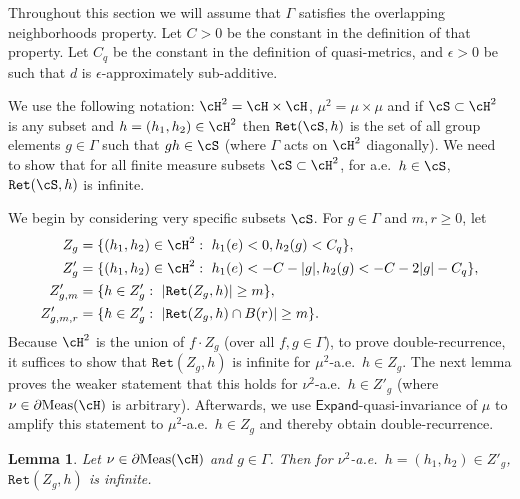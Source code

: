 \documentclass[12pt]{article}
\theoremstyle{plain}
\newtheorem{lem}[thm]{Lemma}
\theoremstyle{definition}
\theoremstyle{remark}
\newcommand{\G}{\Gamma}
\newcommand{\Add}{\mathsf{Expand}}
\newcommand\Expand{{\mathsf{Expand}}}
\newcommand\Meas{{\operatorname{Meas}}}
\newcommand\Ret{\mathtt{Ret}}
\def\cc{{\curvearrowright}}
\begin{document}
Throughout this section we will assume that $\G$ satisfies the overlapping neighborhoods property. Let $C>0$ be the constant in the definition of that property. Let $C_q$ be the constant in the definition of quasi-metrics, and $\epsilon>0$ be such that $d$ is $\epsilon$-approximately sub-additive. 


We use the following notation: $\cH^2=\cH\times \cH$, $\mu^2=\mu\times \mu$ and if $\cS \subset \cH^2$ is any subset and $h=(h_1,h_2)\in \cH^2$ then $\Ret(\cS, h)$ is the set of all group elements $g\in \G$ such that $gh \in \cS$ (where $\G$ acts on $\cH^2$ diagonally). We need to show that for all finite measure subsets $\cS\subset \cH^2$, for a.e.\ $h \in \cS$, $\Ret(\cS, h)$ is infinite. 

We begin by considering very specific subsets $\cS$. For $g \in \G$ and $m,r\ge 0$, let
\begin{align*}
    Z_g&=\{(h_1,h_2)\in \cH^2:~ h_1(e)<0, h_2(g)<C_q\}, \\
    Z'_g&=\{(h_1,h_2)\in \cH^2:~ h_1(e)<-C-|g|, h_2(g)<-C-2|g|-C_q\}, \\
     Z'_{g,m}&=\{h\in Z'_g:~ |\Ret(Z_g, h)|\ge m\}, \\
    Z'_{g,m,r} &=\{h\in Z'_g:~ |\Ret(Z_g, h) \cap B(r)|\ge m\}. %
\end{align*}
Because $\cH^2$ is the union of $f\cdot Z_g$ (over all $f,g \in \G$), to prove double-recurrence, it suffices to show that $\Ret(Z_g,h)$ is infinite for $\mu^2$-a.e.\ $h\in Z_g$. The next lemma proves the weaker statement that this holds for $\nu^2$-a.e.\ $h\in Z'_g$ (where $\nu \in \partial \Meas(\cH)$ is arbitrary). Afterwards, we use $\Add$-quasi-invariance of $\mu$ to amplify this statement to $\mu^2$-a.e.\ $h\in Z_g$ and thereby obtain double-recurrence.


\begin{lem}\label{L:half-way}
Let $\nu \in \partial\Meas(\cH)$ and $g\in \G$. 
Then for $\nu^2$-a.e.\ $h=(h_1,h_2)\in Z'_g$, $\Ret(Z_g, h)$ is infinite.
\end{lem}
\end{document}
